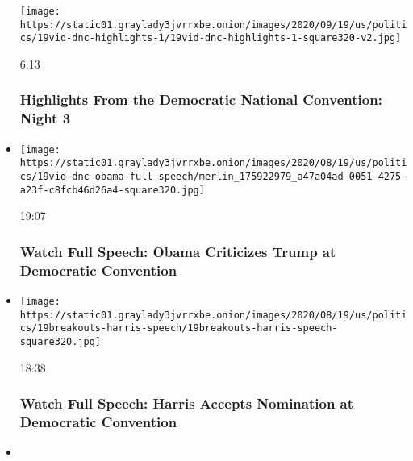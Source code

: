 \begin{itemize}
  \texttt{[image: https://static01.graylady3jvrrxbe.onion/images/2020/09/19/us/politics/19vid-dnc-highlights-1/19vid-dnc-highlights-1-square320-v2.jpg]}

  6:13

  \hypertarget{highlights-from-the-democratic-national-convention-night-3}{%
  \subsubsection{Highlights From the Democratic National Convention:
  Night
  3}\label{highlights-from-the-democratic-national-convention-night-3}}
\item
  \href{https://www.nytimes3xbfgragh.onion/video/us/elections/100000007297653/barack-obama-full-speech-dnc.html?action=click\&module=video-series-bar\&region=header\&pgtype=Article\&playlistId=video/latest-video}{}

  \texttt{[image: https://static01.graylady3jvrrxbe.onion/images/2020/08/19/us/politics/19vid-dnc-obama-full-speech/merlin\_175922979\_a47a04ad-0051-4275-a23f-c8fcb46d26a4-square320.jpg]}

  19:07

  \hypertarget{watch-full-speech-obama-criticizes-trump-at-democratic-convention}{%
  \subsubsection{Watch Full Speech: Obama Criticizes Trump at Democratic
  Convention}\label{watch-full-speech-obama-criticizes-trump-at-democratic-convention}}
\item
  \href{https://www.nytimes3xbfgragh.onion/video/us/elections/100000007297654/kamala-harris-full-speech-dnc.html?action=click\&module=video-series-bar\&region=header\&pgtype=Article\&playlistId=video/latest-video}{}

  \texttt{[image: https://static01.graylady3jvrrxbe.onion/images/2020/08/19/us/politics/19breakouts-harris-speech/19breakouts-harris-speech-square320.jpg]}

  18:38

  \hypertarget{watch-full-speech-harris-accepts-nomination-at-democratic-convention}{%
  \subsubsection{Watch Full Speech: Harris Accepts Nomination at
  Democratic
  Convention}\label{watch-full-speech-harris-accepts-nomination-at-democratic-convention}}
\item
  \href{https://www.nytimes3xbfgragh.onion/video/us/elections/100000007297621/kamala-harris-speaks-dnc.html?action=click\&module=video-series-bar\&region=header\&pgtype=Article\&playlistId=video/latest-video}{}


\end{itemize}
